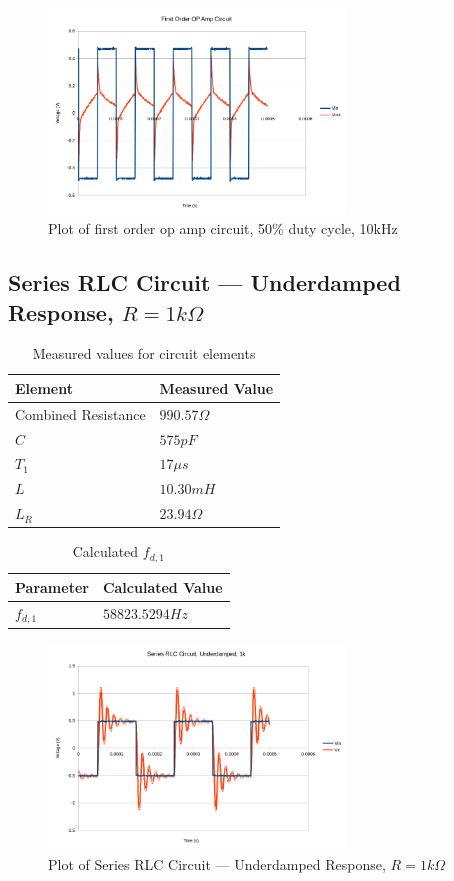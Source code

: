 \documentclass[10pt]{article}
\begin{document}
\begin{figure}[H]
	\centering
	\includegraphics[width=0.7\textwidth]{OPAmp50_10k}
	\caption{Plot of first order op amp circuit, 50\% duty cycle, 10kHz}
\end{figure}

\subsection*{Series RLC Circuit --- Underdamped Response, $R=1k\Omega$}
\begin{table}[H]
	\centering
	\begin{tabular}{ll}
		\hline
		\textbf{Element} & \textbf{Measured Value}\\
		\hline
		Combined Resistance & $990.57 \Omega$\\
		$C$ & $575pF$\\
		$T_1$ & $17\mu s$\\
		$L$ & $10.30mH$\\
		$L_R$ & $23.94\Omega$\\
		\hline
	\end{tabular}
	\caption{Measured values for circuit elements}
\end{table}
\begin{table}[H]
	\centering
	\begin{tabular}{ll}
		\hline
		\textbf{Parameter} & \textbf{Calculated Value}\\
		\hline
		$f_{d,1}$ & $58823.5294 Hz$\\
	\end{tabular}
	\caption{Calculated $f_{d,1}$}
\end{table}
\begin{figure}[H]
	\centering
	\includegraphics[width=0.7\textwidth]{RLC_Under_1k.png}
	\caption{Plot of Series RLC Circuit --- Underdamped Response, $R=1k\Omega$}
\end{figure}
\end{document}
